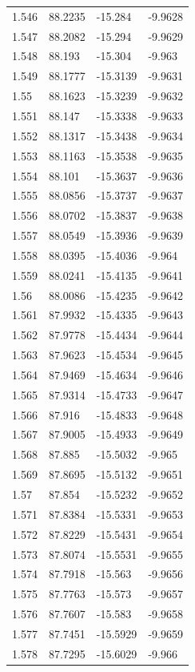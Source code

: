 \begin{tabular}{llll}
1.546 & 88.2235 & -15.284 & -9.9628 \\
1.547 & 88.2082 & -15.294 & -9.9629 \\
1.548 & 88.193 & -15.304 & -9.963 \\
1.549 & 88.1777 & -15.3139 & -9.9631 \\
1.55 & 88.1623 & -15.3239 & -9.9632 \\
1.551 & 88.147 & -15.3338 & -9.9633 \\
1.552 & 88.1317 & -15.3438 & -9.9634 \\
1.553 & 88.1163 & -15.3538 & -9.9635 \\
1.554 & 88.101 & -15.3637 & -9.9636 \\
1.555 & 88.0856 & -15.3737 & -9.9637 \\
1.556 & 88.0702 & -15.3837 & -9.9638 \\
1.557 & 88.0549 & -15.3936 & -9.9639 \\
1.558 & 88.0395 & -15.4036 & -9.964 \\
1.559 & 88.0241 & -15.4135 & -9.9641 \\
1.56 & 88.0086 & -15.4235 & -9.9642 \\
1.561 & 87.9932 & -15.4335 & -9.9643 \\
1.562 & 87.9778 & -15.4434 & -9.9644 \\
1.563 & 87.9623 & -15.4534 & -9.9645 \\
1.564 & 87.9469 & -15.4634 & -9.9646 \\
1.565 & 87.9314 & -15.4733 & -9.9647 \\
1.566 & 87.916 & -15.4833 & -9.9648 \\
1.567 & 87.9005 & -15.4933 & -9.9649 \\
1.568 & 87.885 & -15.5032 & -9.965 \\
1.569 & 87.8695 & -15.5132 & -9.9651 \\
1.57 & 87.854 & -15.5232 & -9.9652 \\
1.571 & 87.8384 & -15.5331 & -9.9653 \\
1.572 & 87.8229 & -15.5431 & -9.9654 \\
1.573 & 87.8074 & -15.5531 & -9.9655 \\
1.574 & 87.7918 & -15.563 & -9.9656 \\
1.575 & 87.7763 & -15.573 & -9.9657 \\
1.576 & 87.7607 & -15.583 & -9.9658 \\
1.577 & 87.7451 & -15.5929 & -9.9659 \\
1.578 & 87.7295 & -15.6029 & -9.966 \\

\end{tabular}
